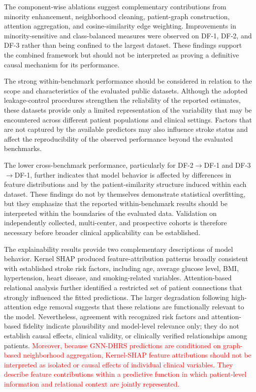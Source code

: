 \documentclass[pdflatex,sn-mathphys-num]{sn-jnl}%
\theoremstyle{thmstyleone}%
\theoremstyle{thmstyletwo}%
\theoremstyle{thmstylethree}%
\begin{document}
{ {
The component-wise ablations suggest complementary contributions from
minority enhancement, neighborhood cleaning, patient-graph construction,
attention aggregation, and cosine-similarity edge weighting. Improvements in
minority-sensitive and class-balanced measures were observed on DF-1, DF-2,
and DF-3 rather than being confined to the largest dataset. These findings
support the combined framework but should not be interpreted as proving a
definitive causal mechanism for its performance.
}

{\color{red}
The strong within-benchmark performance should be considered in relation to
the scope and characteristics of the evaluated public datasets. Although the
adopted leakage-control procedures strengthen the reliability of the reported
estimates, these datasets provide only a limited representation of the
variability that may be encountered across different patient populations and
clinical settings. Factors that are not captured by the available predictors
may also influence stroke status and affect the reproducibility of the
observed performance beyond the evaluated benchmarks.

The lower cross-benchmark performance, particularly for
DF-2$\rightarrow$DF-1 and DF-3$\rightarrow$DF-1, further indicates that model
behavior is affected by differences in feature distributions and by the
patient-similarity structure induced within each dataset. These findings do
not by themselves demonstrate statistical overfitting, but they emphasize
that the reported within-benchmark results should be interpreted within the
boundaries of the evaluated data. Validation on independently collected,
multi-center, and prospective cohorts is therefore necessary before broader
clinical applicability can be established.
}

 {
The explainability results provide two complementary descriptions of model
behavior. Kernel SHAP produced feature-attribution patterns broadly consistent
with established stroke risk factors, including age, average glucose level,
BMI, hypertension, heart disease, and smoking-related variables.
Attention-based relational analysis further identified a restricted set of
patient connections that strongly influenced the fitted predictions. The
larger degradation following high-attention edge removal suggests that these
relations are functionally relevant to the model. Nevertheless, agreement with
recognized risk factors and attention-based fidelity indicate plausibility and
model-level relevance only; they do not establish causal effects, clinical
validity, or clinically verified relationships among patients.
} \textcolor{red}{
Moreover, because GNN-DHRS predictions are conditioned on graph-based
neighborhood aggregation, Kernel-SHAP feature attributions should not be
interpreted as isolated or causal effects of individual clinical variables.
They describe feature contributions within a predictive function in which
patient-level information and relational context are jointly represented.
}

}
\end{document}
